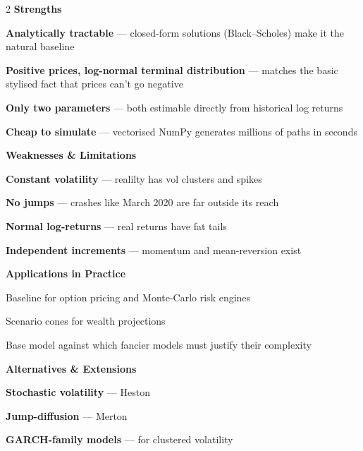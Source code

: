 \documentclass{pyportfolios-note}
\begin{document}
\begingroup
\setlength{\parskip}{3bp}
\begin{multicols}{2}
\textbf{Strengths}

\begin{notebullets}
\item \textbf{Analytically tractable} — closed-form solutions (Black–Scholes)
      make it the natural baseline
\item \textbf{Positive prices, log-normal terminal distribution} — matches the
      basic stylised fact that prices can't go negative
\item \textbf{Only two parameters} — both estimable directly from historical log
      returns
\item \textbf{Cheap to simulate} — vectorised NumPy generates millions of paths
      in seconds
\end{notebullets}

\textbf{Weaknesses \& Limitations}

\begin{notebullets}
\item \textbf{Constant volatility} — realilty has vol clusters and spikes
\item \textbf{No jumps} — crashes like March 2020 are far outside its reach
\item \textbf{Normal log-returns} — real returns have fat tails
\item \textbf{Independent increments} — momentum and mean-reversion exist
\end{notebullets}

\textbf{Applications in Practice}

\begin{notebullets}
\item Baseline for option pricing and Monte-Carlo risk engines
\item Scenario cones for wealth projections
\item Base model against which fancier models must justify their complexity
\end{notebullets}

\textbf{Alternatives \& Extensions}

\begin{notebullets}
\item \textbf{Stochastic volatility} — Heston
\item \textbf{Jump-diffusion} — Merton
\item \textbf{GARCH-family models} — for clustered volatility
\end{notebullets}
\end{multicols}
\endgroup
\end{document}
